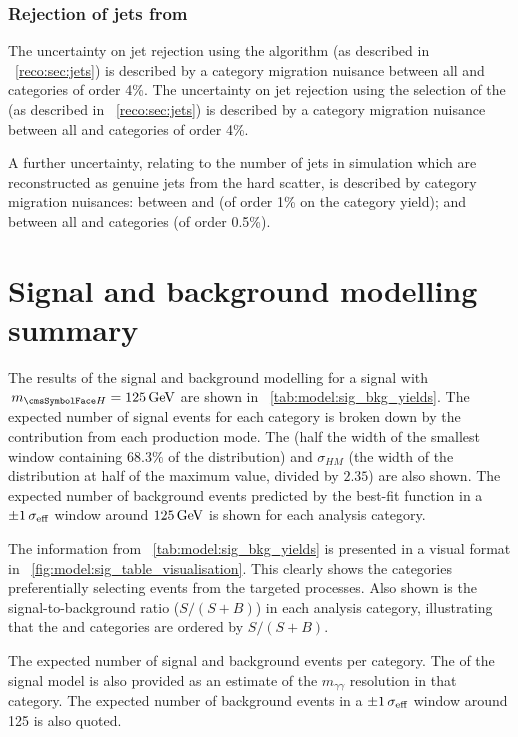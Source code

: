 \subsubsection{Rejection of jets from \PU}
\ifNewAnalysis
The uncertainty on \PU jet rejection using the \PUJID algorithm (as described in \Sec~\ref{reco:sec:jets}) is described by a category migration nuisance between all \VBF and \Untagged categories of order 4\%.
\else
The uncertainty on \PU jet rejection using the selection of the \RMS (as described in \Sec~\ref{reco:sec:jets}) is described by a category migration nuisance between all \VBF and \Untagged categories of order 4\%.
\fi

A further uncertainty, relating to the number of \PU jets in simulation which are reconstructed as genuine jets from the hard scatter, is described by category migration nuisances: between  and  (of order 1\% on the category yield); and between all \VBF and \Untagged categories (of order 0.5\%).

\section{Signal and background modelling summary}

The results of the signal and background modelling for a signal with $\mH=125\GeV$ are shown in \Table~\ref{tab:model:sig_bkg_yields}. The expected number of signal events for each category is broken down by the contribution from each production mode. The \effSigma (half the width of the smallest window containing $68.3\%$ of the distribution) and $\sigma_{HM}$ (the width of the distribution at half of the maximum value, divided by $2.35$) are also shown. The expected number of background events predicted by the best-fit function in a $\pm 1 \,\sigma_{\text{eff}}$ window around $125\,\text{Ge\hspace{-.08em}V}$ is shown for each analysis category. 

The information from \Table~\ref{tab:model:sig_bkg_yields} is presented in a visual format in \Fig~\ref{fig:model:sig_table_visualisation}. This clearly shows the categories preferentially selecting events from the targeted processes. Also shown is the signal-to-background ratio ($S/(S+B)$) in each analysis category, illustrating that the \Untagged and \VBFTag categories are ordered by $S/(S+B)$. 

 \begin{table}
 \resizebox{\textwidth}{!}{

}
 \caption{ The expected number of signal and background events per category. The \effSigma of the signal model is also provided as an estimate of the $m_{\gamma\gamma}$ resolution in that category. The expected number of background events in a $\pm 1 \,\sigma_{\text{eff}}$ window around 125 \GeV is also quoted.}
 \label{tab:model:sig_bkg_yields}
\end{table}

